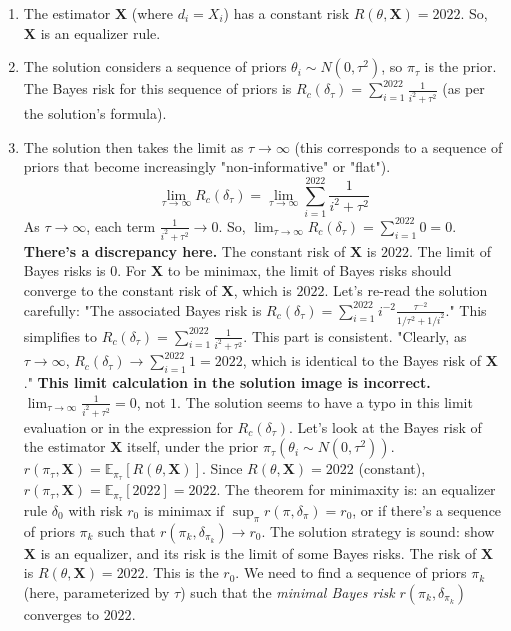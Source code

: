 \begin{enumerate}
	\item The estimator $\mathbf{X}$ (where $d_i = X_i$) has a constant risk $R(\theta, \mathbf{X}) = 2022$. So, $\mathbf{X}$ is an equalizer rule.
	\item The solution considers a sequence of priors $\theta_i \sim N(0, \tau^2)$, so $\pi_\tau$ is the prior.
The Bayes risk for this sequence of priors is $R_c(\delta_\tau) = \sum_{i=1}^{2022} \frac{1}{i^2+\tau^2}$ (as per the solution's formula).
	\item The solution then takes the limit as $\tau \to \infty$ (this corresponds to a sequence of priors that become increasingly "non-informative" or "flat").
\[
\lim_{\tau \to \infty} R_c(\delta_\tau) = \lim_{\tau \to \infty} \sum_{i=1}^{2022} \frac{1}{i^2+\tau^2}
\]As $\tau \to \infty$, each term $\frac{1}{i^2+\tau^2} \to 0$.
So, $\lim_{\tau \to \infty} R_c(\delta_\tau) = \sum_{i=1}^{2022} 0 = 0$.
\textbf{There's a discrepancy here.} The constant risk of $\mathbf{X}$ is $2022$. The limit of Bayes risks is $0$.
For $\mathbf{X}$ to be minimax, the limit of Bayes risks should converge to the constant risk of $\mathbf{X}$, which is $2022$.
Let's re-read the solution carefully:
"The associated Bayes risk is $R_c(\delta_\tau) = \sum_{i=1}^{2022} i^{-2} \frac{\tau^{-2}}{1/\tau^2+1/i^2}$."
This simplifies to $R_c(\delta_\tau) = \sum_{i=1}^{2022} \frac{1}{i^2+\tau^2}$. This part is consistent.
"Clearly, as $\tau \to \infty$, $R_c(\delta_\tau) \to \sum_{i=1}^{2022} 1 = 2022$, which is identical to the Bayes risk of $\mathbf{X}$."
\textbf{This limit calculation in the solution image is incorrect.}
$\lim_{\tau \to \infty} \frac{1}{i^2+\tau^2} = 0$, not $1$.
The solution seems to have a typo in this limit evaluation or in the expression for $R_c(\delta_\tau)$.
Let's look at the Bayes risk of the estimator $\mathbf{X}$ itself, under the prior $\pi_\tau (\theta_i \sim N(0, \tau^2))$.
$r(\pi_\tau, \mathbf{X}) = \mathbb{E}_{\pi_\tau}[R(\theta, \mathbf{X})]$. Since $R(\theta, \mathbf{X}) = 2022$ (constant),
$r(\pi_\tau, \mathbf{X}) = \mathbb{E}_{\pi_\tau}[2022] = 2022$.
The theorem for minimaxity is: an equalizer rule $\delta_0$ with risk $r_0$ is minimax if $\sup_{\pi} r(\pi, \delta_\pi) = r_0$, or if there's a sequence of priors $\pi_k$ such that $r(\pi_k, \delta_{\pi_k}) \to r_0$.
The solution strategy is sound: show $\mathbf{X}$ is an equalizer, and its risk is the limit of some Bayes risks.
The risk of $\mathbf{X}$ is $R(\theta, \mathbf{X}) = 2022$. This is the $r_0$.
We need to find a sequence of priors $\pi_k$ (here, parameterized by $\tau$) such that the \textit{minimal Bayes risk} $r(\pi_k, \delta_{\pi_k})$ converges to $2022$.

\end{enumerate}
